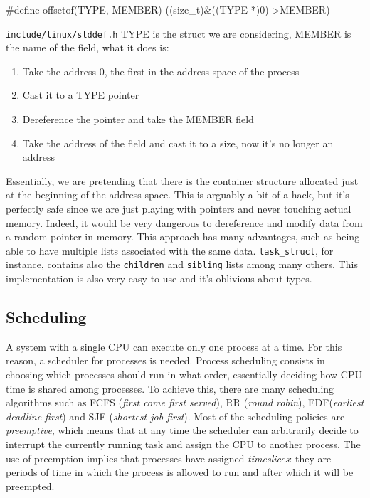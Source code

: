 \documentclass[10pt, oneside]{book}
\begin{document}
\begin{code}
#define offsetof(TYPE, MEMBER) ((size_t)&((TYPE *)0)->MEMBER)
\end{code}
\verb|include/linux/stddef.h|
TYPE is the struct we are considering, MEMBER is the name of the field, what it does is:
\begin{enumerate}
    \item Take the address 0, the first in the address space of the process
    \item Cast it to a TYPE pointer 
    \item Dereference the pointer and take the MEMBER field
    \item Take the address of the field and cast it to a size, now it's no longer an address
\end{enumerate}
Essentially, we are pretending that there is the container structure allocated just at the beginning of the address space. This is arguably a bit of a hack, but it's perfectly safe since we are just playing with pointers and never touching actual memory. Indeed, it would be very dangerous to dereference and modify data from a random pointer in memory. This approach has many advantages, such as being able to have multiple lists associated with the same data. \verb|task_struct|, for instance, contains also the \verb|children| and \verb|sibling| lists among many others. This implementation is also very easy to use and it's oblivious about types.

\subsection{Scheduling} 
\label{sec:scheduling}
A system with a single CPU can execute only one process at a time. For this reason, a scheduler for processes is needed. Process scheduling consists in choosing which processes should run in what order, essentially deciding how CPU time is shared among processes. To achieve this, there are many scheduling algorithms such as FCFS (\textit{first come first served}), RR (\textit{round robin}), EDF(\textit{earliest deadline first}) and SJF (\textit{shortest job first}). Most of the scheduling policies are \textit{preemptive}, which means that at any time the scheduler can arbitrarily decide to interrupt the currently running task and assign the CPU to another process. The use of preemption implies that processes have assigned \textit{timeslices}: they are periods of time in which the process is allowed to run and after which it will be preempted. 
\end{document}

